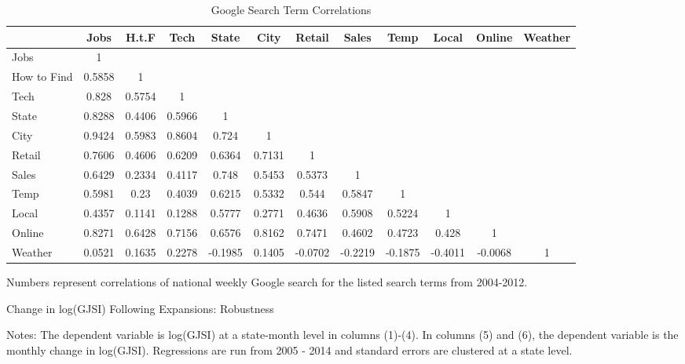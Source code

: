 \documentclass[12pt]{article}
\begin{document}
\begin{spacing}{2}
\begin{appendix}
\begin{sidewaystable}[!htpb]
\centering
\begin{threeparttable}
\caption{Google Search Term Correlations}
\label{tab:termcorrelations}
\begin{tabular}{lccccccccccc}
\hline
  &Jobs & H.t.F & Tech & State & City & Retail& Sales & Temp & Local& Online & Weather \\
\hline
Jobs	&	1	&		&		&		&		&		&		&		&		&		&	\\
How to Find	&	0.5858	&	1	&		&		&		&		&		&		&		&		&		\\
Tech	&	0.828	&	0.5754	&	1	&		&		&		&		&		&		&		&		\\
State	&	0.8288	&	0.4406	&	0.5966	&	1	&		&		&		&		&		&		&		\\
City	&	0.9424	&	0.5983	&	0.8604	&	0.724	&	1	&		&		&		&		&		&		\\
Retail	&	0.7606	&	0.4606	&	0.6209	&	0.6364	&	0.7131	&	1	&		&		&		&		&		\\
Sales	&	0.6429	&	0.2334	&	0.4117	&	0.748	&	0.5453	&	0.5373	&	1	&		&		&		&		\\
Temp	&	0.5981	&	0.23	&	0.4039	&	0.6215	&	0.5332	&	0.544	&	0.5847	&	1	&		&		&		\\
Local	&	0.4357	&	0.1141	&	0.1288	&	0.5777	&	0.2771	&	0.4636	&	0.5908	&	0.5224	&	1	&		&		\\
Online	&	0.8271	&	0.6428	&	0.7156	&	0.6576	&	0.8162	&	0.7471	&	0.4602	&	0.4723	&	0.428	&	1	&	\\	
Weather	&	0.0521	&	0.1635	&	0.2278	&	-0.1985	&	0.1405	&	-0.0702	&	-0.2219	&	-0.1875	&	-0.4011	&	-0.0068	&	1	\\
\hline
\end{tabular}
\begin{tablenotes}
\item Numbers represent correlations of national weekly Google search for the listed search terms from 2004-2012.
\end{tablenotes}
\end{threeparttable}
\end{sidewaystable}


\begin{table}
\caption{Change in log(GJSI) Following Expansions: Robustness \label{tab:robustexpansion}}
\begin{threeparttable}
\begin{center}

\begin{tablenotes}
\item Notes: The dependent variable is log(GJSI) at a state-month level in columns (1)-(4). In columns (5) and (6), the dependent variable is the monthly change in log(GJSI). Regressions are run from 2005 - 2014 and standard errors are clustered at a state level.
\end{tablenotes}
\end{center}
\end{threeparttable}
\end{table}


\end{appendix}
\end{spacing}
\end{document}
